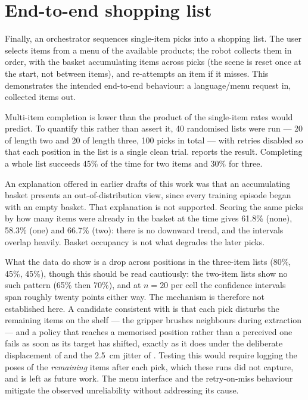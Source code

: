 \section{End-to-end shopping list}
\label{sec:results-orchestrator}
Finally, an orchestrator sequences single-item picks into a shopping list. The user
selects items from a menu of the available products; the robot collects them in
order, with the basket accumulating items across picks (the scene is reset once at
the start, not between items), and re-attempts an item if it misses. This
demonstrates the intended end-to-end behaviour: a language/menu request in,
collected items out.

Multi-item completion is lower than the product of the single-item rates would
predict. To quantify this rather than assert it, 40 randomised lists were run --- 20 of
length two and 20 of length three, 100 picks in total --- with retries disabled so that
each position in the list is a single clean trial.  reports the
result. Completing a whole list succeeds 45\% of the time for two items and 30\% for
three.

An explanation offered in earlier drafts of this work was that an accumulating basket
presents an out-of-distribution view, since every training episode began with an empty
basket. That explanation is not supported. Scoring the same picks by how many items
were already in the basket at the time gives 61.8\% (none), 58.3\% (one) and 66.7\%
(two): there is no downward trend, and the intervals overlap heavily. Basket occupancy
is not what degrades the later picks.

What the data do show is a drop across positions in the three-item lists (80\%, 45\%,
45\%), though this should be read cautiously: the two-item lists show no such pattern
(65\% then 70\%), and at $n=20$ per cell the confidence intervals span roughly twenty
points either way. The mechanism is therefore not established here. A candidate
consistent with  is that each pick disturbs the remaining
items on the shelf --- the gripper brushes neighbours during extraction --- and a policy
that reaches a memorised position rather than a perceived one fails as soon as its
target has shifted, exactly as it does under the deliberate displacement of
 and the \SI{2.5}{cm} jitter of
. Testing this would require logging the poses of the
\emph{remaining} items after each pick, which these runs did not capture, and is left
as future work. The menu interface and the retry-on-miss behaviour mitigate the
observed unreliability without addressing its cause.

